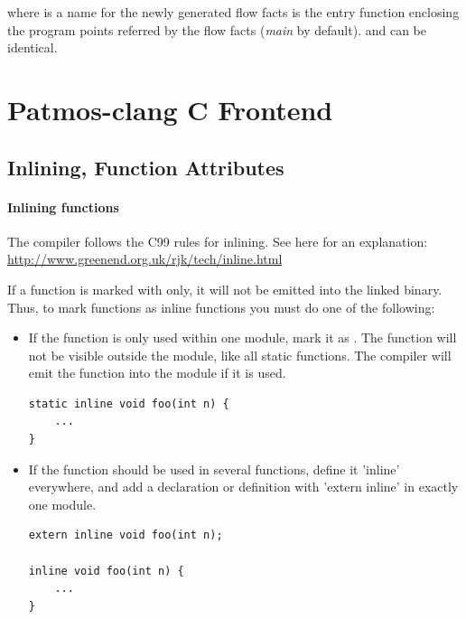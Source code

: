 where  is a name for the newly generated flow facts
 is the entry function enclosing the program points referred by
the flow facts (\emph{main} by default).
%
 and  can be identical.



\section{Patmos-clang C Frontend}
\label{sec:toolchain:frontend}

\subsection{Inlining, Function Attributes}

\paragraph{Inlining functions}
The compiler follows the C99 rules for inlining. See here for an explanation:
%
\url{http://www.greenend.org.uk/rjk/tech/inline.html}

If a function is marked with  only, it will not be emitted into the linked binary.
Thus, to mark functions as inline functions you must do one of the following:

\begin{itemize}
\item If the function is only used within one module, mark it as .
The function will not be visible outside the module, like all static functions. The compiler will emit the 
function into the module if it is used.

\begin{verbatim}
static inline void foo(int n) {
    ...
}
\end{verbatim}

\item If the function should be used in several functions, define it 'inline' everywhere,
  and add a declaration or definition with 'extern inline' in exactly one module.

\begin{verbatim}
extern inline void foo(int n);

inline void foo(int n) {
    ...
}
\end{verbatim}
\end{itemize}

